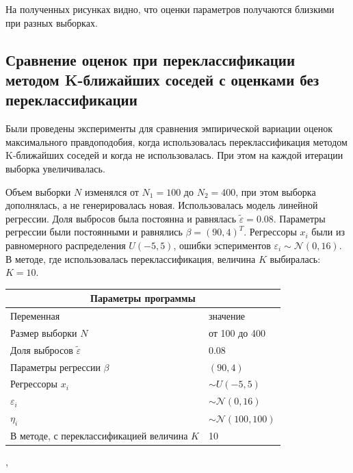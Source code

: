 На полученных рисунках видно, что оценки параметров получаются близкими при разных выборках.

\subsection{Сравнение оценок при переклассификации методом K-ближайших соседей с оценками без переклассификации}
Были проведены эксперименты для сравнения эмпирической вариации оценок максимального правдоподобия, когда использовалась переклассификация методом K-ближайших соседей и когда не использовалась. При этом на каждой итерации выборка увеличивалась. 

Объем выборки $N$ изменялся от $N_1=100$ до $N_2=400$, при этом выборка дополнялась, а не генерировалась новая. Использовалась модель линейной регрессии. Доля выбросов была постоянна и равнялась $\widetilde{\varepsilon}=0.08$. Параметры регрессии были постоянными и равнялись $\beta=(90,4)^T$. 
Регрессоры $x_i$ были из равномерного распределения $U(-5,5)$, ошибки эспериментов $\varepsilon_i\sim \mathcal{N}(0,16)$. В методе, где использовалась переклассификация, величина $K$ выбиралась: $K=10$.
\newpage
\vspace{3cm}
\begin{center}
    \label{tab1}
    \begin{tabular}{|p{5cm}|p{5cm}|}
        \hline
        \multicolumn{2}{|c|}{Параметры программы} \\
        \hline
        Переменная&значение\\
        \hline
        Размер выборки $N$& от 100 до 400\\
        \hline
        Доля выбросов $\widetilde{\varepsilon}$& 0.08\\
        \hline
        Параметры регрессии $\beta$& $(90,4)$\\
        \hline
        Регрессоры $x_i$ & $\sim U(-5,5)$\\
        \hline
        $\varepsilon_i$&$\sim \mathcal{N}(0,16)$\\
        \hline
        $\eta_i$&$\sim \mathcal{N}(100,100)$\\
        \hline
        В методе, с переклассификацией величина $K$& 10\\
        \hline
    \end{tabular},
\end{center}


